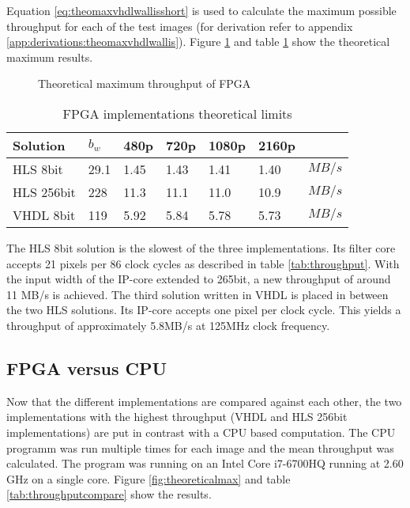Equation \ref{eq:theomaxvhdlwallisshort} is used to calculate the maximum
possible throughput for each of the test images (for derivation refer to
appendix \ref{app:derivations:theomaxvhdlwallis}). Figure \ref{fig:theoresults}
and table \ref{tab:FPGAimplementationstheoreticallimits} show the theoretical
maximum results.

\begin{figure}[b!]
    \centering
    \begin{adjustbox}{max width=\linewidth}
        
    \end{adjustbox}
    \caption{Theoretical maximum throughput of FPGA}
    \label{fig:theoresults}
\end{figure}

\begin{table}[b!]
    \centering
    \begin{tabular}{l l l l l l l}
        \toprule
        Solution & $b_w$ & 480p & 720p & 1080p & 2160p & \\
        \midrule
        HLS  8bit       & 29.1 & 1.45 & 1.43 & 1.41 & 1.40 & $MB/s$\\
        HLS  256bit     & 228  & 11.3 & 11.1 & 11.0 & 10.9 & $MB/s$\\
        VHDL 8bit          & 119  & 5.92 & 5.84 & 5.78 & 5.73 & $MB/s$\\
        \bottomrule
    \end{tabular}
    \caption{FPGA implementations theoretical limits}
    \label{tab:FPGAimplementationstheoreticallimits}
\end{table}

The HLS 8bit solution is the slowest of the three implementations. Its filter
core accepts 21 pixels per 86 clock cycles as described in table \ref{tab:throughput}. 
With the input width of the IP-core extended to 265bit,
a new throughput of around 11 MB/s is achieved. The third solution written
in VHDL is placed in between the two HLS solutions. Its IP-core accepts one
pixel per clock cycle. This yields a throughput of approximately 5.8MB/s at
125MHz clock frequency.

\clearpage
\subsection{FPGA versus CPU}
Now that the different implementations are compared against each other, the
two implementations with the highest throughput (VHDL and HLS 256bit
implementations) are put in contrast with a CPU based computation.  The CPU
programm was run multiple times for each image and the mean throughput was
calculated. The program was running on an Intel Core i7-6700HQ running at 2.60
GHz on a single core.  Figure \ref{fig:theoreticalmax} and table
\ref{tab:throughputcompare} show the results.
\\

